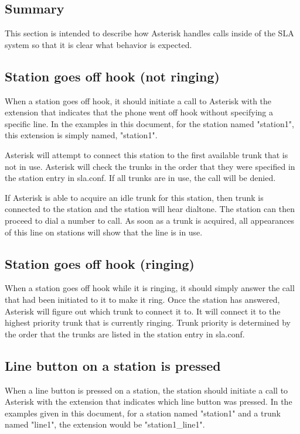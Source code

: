 \subsection{Summary}

This section is intended to describe how Asterisk handles calls inside of the
SLA system so that it is clear what behavior is expected.

\subsection{Station goes off hook (not ringing)}

When a station goes off hook, it should initiate a call to Asterisk with the
extension that indicates that the phone went off hook without specifying a
specific line.  In the examples in this document, for the station named
"station1", this extension is simply named, "station1".

Asterisk will attempt to connect this station to the first available trunk
that is not in use.  Asterisk will check the trunks in the order that they
were specified in the station entry in sla.conf.  If all trunks are in use,
the call will be denied.

If Asterisk is able to acquire an idle trunk for this station, then trunk
is connected to the station and the station will hear dialtone.  The station
can then proceed to dial a number to call.  As soon as a trunk is acquired,
all appearances of this line on stations will show that the line is in use.

\subsection{Station goes off hook (ringing)}

When a station goes off hook while it is ringing, it should simply answer
the call that had been initiated to it to make it ring.  Once the station
has answered, Asterisk will figure out which trunk to connect it to.  It
will connect it to the highest priority trunk that is currently ringing.
Trunk priority is determined by the order that the trunks are listed in
the station entry in sla.conf.

\subsection{Line button on a station is pressed}

When a line button is pressed on a station, the station should initiate a
call to Asterisk with the extension that indicates which line button was
pressed.  In the examples given in this document, for a station named
"station1" and a trunk named "line1", the extension would be "station1\_line1".

